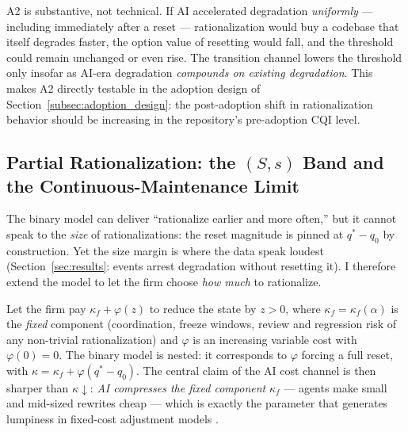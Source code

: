 \begin{remark}
\label{rem:uniform}
A2 is substantive, not technical. If AI accelerated degradation
\emph{uniformly} --- including immediately after a reset --- rationalization
would buy a codebase that itself degrades faster, the option value of
resetting would fall, and the threshold could remain unchanged or even
rise. The transition channel lowers the threshold only insofar as AI-era
degradation \emph{compounds on existing degradation}. This makes A2
directly testable in the adoption design of
Section~\ref{subsec:adoption_design}: the post-adoption shift in
rationalization behavior should be increasing in the repository's
pre-adoption CQI level.
\end{remark}

\subsection{Partial Rationalization: the $(S,s)$ Band and the
Continuous-Maintenance Limit}
\label{subsec:ssband}

The binary model can deliver ``rationalize earlier and more often,'' but it
cannot speak to the \emph{size} of rationalizations: the reset magnitude is
pinned at $q^* - q_0$ by construction. Yet the size margin is where the
data speak loudest (Section~\ref{sec:results}: events arrest degradation
without resetting it). I therefore extend the model to let the firm choose
\emph{how much} to rationalize.

Let the firm pay $\kappa_f + \varphi(z)$ to reduce the state by $z > 0$,
where $\kappa_f = \kappa_f(\alpha)$ is the \emph{fixed} component
(coordination, freeze windows, review and regression risk of any
non-trivial rationalization) and $\varphi$ is an increasing variable cost
with $\varphi(0) = 0$. The binary model is nested: it corresponds to
$\varphi$ forcing a full reset, with $\kappa = \kappa_f + \varphi(q^*-q_0)$.
The central claim of the AI cost channel is then sharper than
$\kappa\!\downarrow$: \emph{AI compresses the fixed component}
$\kappa_f$ --- agents make small and mid-sized rewrites cheap --- which is
exactly the parameter that generates lumpiness in fixed-cost adjustment
models \citep{barro1972, grossmanlaroque1990, caballeroengel1999,
cooperhaltiwanger2006}.

